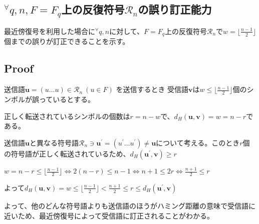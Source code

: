 \documentclass[12pt,a4paper]{article}
\begin{document}
\subsection*{\texorpdfstring{${}^\forall q, n, F = F_q$上の反復符号$\mathcal{R}_n$の誤り訂正能力}{{}^{}\forall q, nに対してF = F_q上の反復符号_nの誤り訂正能力}}\label{forall-q-nux306bux5bfeux3057ux3066f-f_qux4e0aux306eux30d1ux30eaux30c6ux30a3ux691cux67fbux7b26ux53f7mathcalp_nux306eux8aa4ux308aux8a02ux6b63ux80fdux529b}

最近傍復号を利用した場合に${}^\forall q,n$に対して、$F = F_q$上の反復符号$\mathcal{R}_n$で$w = \lfloor \frac{n-1}{2} \rfloor$個までの誤りが訂正できることを示す。

\subsection*{Proof}\label{proof}

送信語$\mathbf{u} = (u \dots u) \in \mathcal{R}_n \  (u \in F)$ を送信するとき
受信語$\mathbf{v}$は$w \leq \lfloor \frac{n-1}{2} \rfloor$個のシンボルが誤っているとする。

正しく転送されているシンボルの個数は$r = n - w$で、$d_H (\mathbf u , \mathbf v) = w = n - r$である。

送信語$\mathbf{u}$と異なる符号語$\mathcal{R}_n \ni \mathbf{u}^\prime = (u^\prime \dots u^\prime) \neq \mathbf{u}$について考える。このとき$r$個の符号語が正しく転送されているため、$d_H (\mathbf{u}^\prime, \mathbf{v}) \geq r$

$w = n - r \leq \lfloor \frac{n - 1}{2} \rfloor \Leftrightarrow 2(n - r) \leq n - 1 \Leftrightarrow n + 1 \leq 2r \Leftrightarrow \frac{n + 1}{2} \leq r$

よって$d_H(\mathbf{u} , \mathbf{v}) = w \leq \lfloor \frac{n - 1}{2} \rfloor < \frac{n + 1}{2} \leq r \leq d_H (\mathbf{u}^\prime , \mathbf{v})$

よって、他のどんな符号語よりも送信語のほうがハミング距離の意味で受信語に近いため、最近傍復号によって受信語に訂正されることがわかる。
\end{document}
